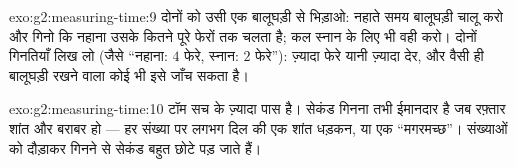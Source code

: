\begin{solution}{exo:g2:measuring-time:9}
दोनों को उसी एक बालूघड़ी से भिड़ाओ: नहाते समय बालूघड़ी चालू करो और
गिनो कि नहाना उसके कितने पूरे फेरों तक चलता है; कल स्नान के लिए भी
वही करो। दोनों गिनतियाँ लिख लो (जैसे ``नहाना: $4$ फेरे, स्नान: $2$
फेरे''): ज़्यादा फेरे यानी ज़्यादा देर, और वैसी ही बालूघड़ी रखने वाला
कोई भी इसे जाँच सकता है।
\end{solution}

\begin{solution}{exo:g2:measuring-time:10}
टॉम सच के ज़्यादा पास है। सेकंड गिनना तभी ईमानदार है जब रफ़्तार शांत
और बराबर हो --- हर संख्या पर लगभग दिल की एक शांत धड़कन, या एक
``मगरमच्छ''। संख्याओं को दौड़ाकर गिनने से सेकंड बहुत छोटे पड़ जाते
हैं।
\end{solution}
